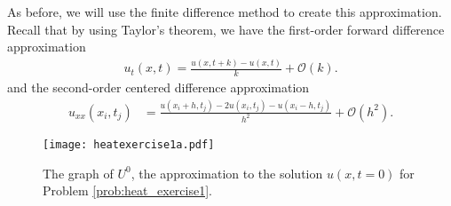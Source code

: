 \begin{comment}
A common method for modeling ordinary and partial differential equations is the finite difference method, so-named because equations containing derivatives are replaced with equations containing difference schemes.
These difference schemes can often be found using Taylor's theorem.
For example, the equation
\begin{align*}
	u(x,t_j + k) = u(x,t_j) + u_t(x,t_j)k + \mathcal{O}(k^2)
\end{align*}
yields a first-order forward difference approximation to $u_t(x,t_j)$, namely,
\begin{align*}
	u_t(x,t_j ) = \frac{u(x,t_j+k) - u(x,t_j)}{k} + \mathcal{O}(k).
\end{align*}
Similarly, by adding the equations
\begin{align*}
	u(x_i+h,t) &= u(x_i,t) + u_x(x_i,t)h + u_{xx}(x_i,t)\frac{h^2}{2} + u_{xxx}(x_i,t)h^3 + \mathcal{O}(h^4),\\
	u(x_i-h,t) &= u(x_i,t) + u_x(x_i,t)(-h) + u_{xx}(x_i,t)\frac{(-h)^2}{2} + u_{xxx}(x_i,t)(-h)^3 + \mathcal{O}(h^4),
\end{align*}
we obtain a second-order centered difference approximation to $u_{xx}(x_i,t)$:
\begin{align*}
	u_{xx}(x_i,t_j) &= \frac{u(x_i + h,t_j )-2 u(x_i,t_j)- u(x_i - h,t_j)}{h^2} + \mathcal{O}(h^2).
\end{align*}
\end{comment}

As before, we will use the finite difference method to create this approximation.
Recall that by using Taylor's theorem, we have the first-order forward difference approximation
\begin{align*}
	u_t(x,t) = \frac{u(x,t+k) - u(x,t)}{k} + \mathcal{O}(k).
\end{align*}
and the second-order centered difference approximation
\begin{align*}
	u_{xx}(x_i,t_j) &= \frac{u(x_i + h,t_j )-2 u(x_i,t_j)- u(x_i - h,t_j)}{h^2} + \mathcal{O}(h^2).
\end{align*}

\begin{figure}
\centering
\texttt{[image: heatexercise1a.pdf]}
\caption{The graph of $U^{0}$, the approximation to the solution $u(x,t=0)$ for Problem \ref{prob:heat_exercise1}.}
\label{fig:heatexercise1a}
\end{figure}

